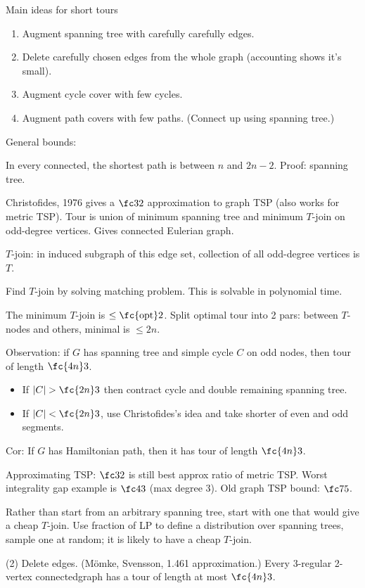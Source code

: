 Main ideas for short tours
\begin{enumerate}
\item
Augment spanning tree with carefully carefully edges.
\item
Delete carefully chosen edges from the whole graph (accounting shows it's small).
\item
Augment cycle cover with few cycles.
\item
Augment path covers with few paths. (Connect up using spanning tree.)
\end{enumerate}

General bounds:

In every connected, the shortest path is between $n$ and $2n-2$. Proof: spanning tree.

Christofides, 1976 gives a $\fc32$ approximation to graph TSP (also works for metric TSP). Tour is union of minimum spanning tree and minimum $T$-join on odd-degree vertices. Gives connected Eulerian graph.

$T$-join: in induced subgraph of this edge set, collection of all odd-degree vertices is $T$.

Find $T$-join by solving matching problem. %
This is solvable in polynomial time.

The minimum $T$-join is $\le \fc{\text{opt}}2$. Split optimal tour into 2 pars: between $T$-nodes and others, minimal is $\le 2n$.

Observation: if $G$ has spanning tree and simple cycle $C$ on odd nodes, then tour of length $\fc{4n}3$.
\begin{itemize}
\item
If $|C|>\fc{2n}3$ then contract cycle and double remaining spanning tree.
\item
If $|C|<\fc{2n}3$, use Christofides's idea and take shorter of even and odd segments.
\end{itemize}
Cor: If $G$ has Hamiltonian path, then it has tour of length $\fc{4n}3$.

Approximating TSP: $\fc32$ is still best approx ratio of metric TSP. Worst integrality gap example is $\fc43$ (max degree 3). Old graph TSP bound: $\fc 75$.

Rather than start from an arbitrary spanning tree, start with one that would give a cheap $T$-join. Use fraction of LP to define a distribution over spanning trees, sample one at random; it is likely to have a cheap $T$-join.

(2) Delete edges. (M\"omke, Svensson, 1.461 approximation.) Every 3-regular 2-vertex connectedgraph has a tour of length at most $\fc{4n}3$.

